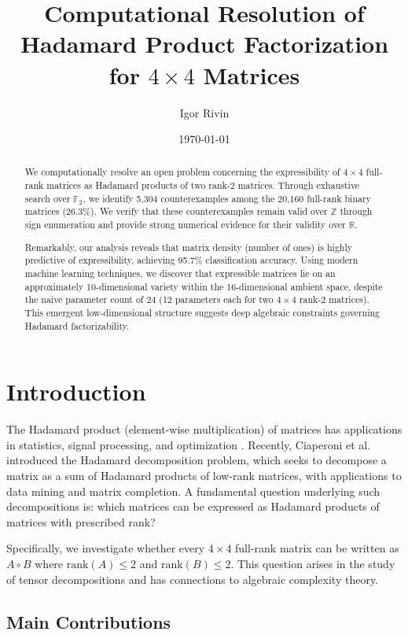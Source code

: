 \documentclass[11pt]{amsart}
\title{Computational Resolution of Hadamard Product Factorization for $4 \times 4$ Matrices}
\author{Igor Rivin}\thanks{with computational assistance from Claude}
\date{\today}
\theoremstyle{plain}
\theoremstyle{definition}
\theoremstyle{remark}
\begin{document}
\begin{abstract}
We computationally resolve an open problem concerning the expressibility of $4 \times 4$ full-rank matrices as Hadamard products of two rank-2 matrices. Through exhaustive search over $\mathbb{F}_2$, we identify 5,304 counterexamples among the 20,160 full-rank binary matrices (26.3\%). We verify that these counterexamples remain valid over $\mathbb{Z}$ through sign enumeration and provide strong numerical evidence for their validity over $\mathbb{R}$. 

Remarkably, our analysis reveals that matrix density (number of ones) is highly predictive of expressibility, achieving 95.7\% classification accuracy. Using modern machine learning techniques, we discover that expressible matrices lie on an approximately 10-dimensional variety within the 16-dimensional ambient space, despite the naive parameter count of 24 (12 parameters each for two $4 \times 4$ rank-2 matrices). This emergent low-dimensional structure suggests deep algebraic constraints governing Hadamard factorizability.
\end{abstract}
\maketitle

\section{Introduction}

The Hadamard product (element-wise multiplication) of matrices has applications in statistics, signal processing, and optimization \cite{horn1990hadamard,styan1973hadamard}. Recently, Ciaperoni et al. \cite{ciaperoni2024hadamard} introduced the Hadamard decomposition problem, which seeks to decompose a matrix as a sum of Hadamard products of low-rank matrices, with applications to data mining and matrix completion. A fundamental question underlying such decompositions is: which matrices can be expressed as Hadamard products of matrices with prescribed rank?

Specifically, we investigate whether every $4 \times 4$ full-rank matrix can be written as $A \circ B$ where $\mathrm{rank}(A) \leq 2$ and $\mathrm{rank}(B) \leq 2$. This question arises in the study of tensor decompositions and has connections to algebraic complexity theory.

\subsection{Main Contributions}
\end{document}
